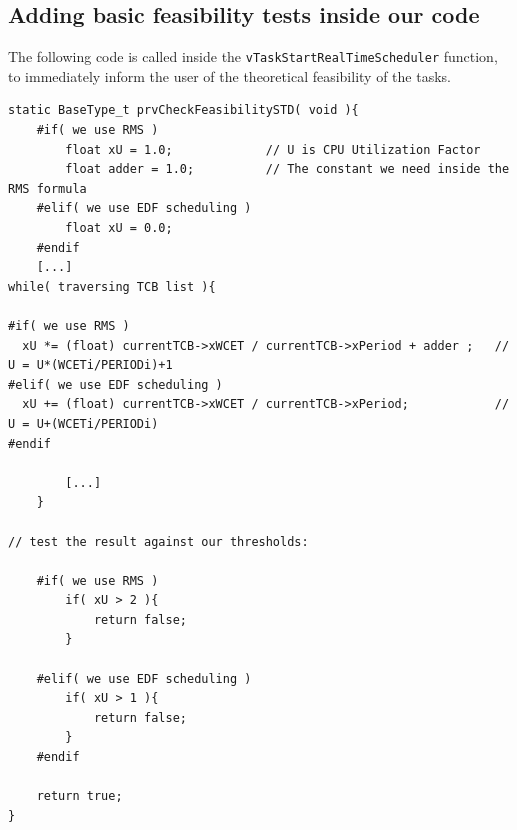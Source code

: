 \documentclass[10pt]{article}
\begin{document}
\subsection{Adding basic feasibility tests inside our code}
The following code is called inside the \verb|vTaskStartRealTimeScheduler| function, to immediately inform the user of the theoretical feasibility of the tasks.
\begin{lstlisting}
static BaseType_t prvCheckFeasibilitySTD( void ){
    #if( we use RMS )
        float xU = 1.0;				// U is CPU Utilization Factor
        float adder = 1.0;			// The constant we need inside the RMS formula
    #elif( we use EDF scheduling )
        float xU = 0.0;
    #endif
    [...]
while( traversing TCB list ){
    
#if( we use RMS )
  xU *= (float) currentTCB->xWCET / currentTCB->xPeriod + adder ; 	// U = U*(WCETi/PERIODi)+1
#elif( we use EDF scheduling )
  xU += (float) currentTCB->xWCET / currentTCB->xPeriod;			// U = U+(WCETi/PERIODi)
#endif
        
        [...]
    }

// test the result against our thresholds:	
	
    #if( we use RMS )
        if( xU > 2 ){
            return false;
        }

    #elif( we use EDF scheduling )
        if( xU > 1 ){
            return false;
        }
    #endif

    return true;
}
\end{lstlisting}
 
\end{document}
